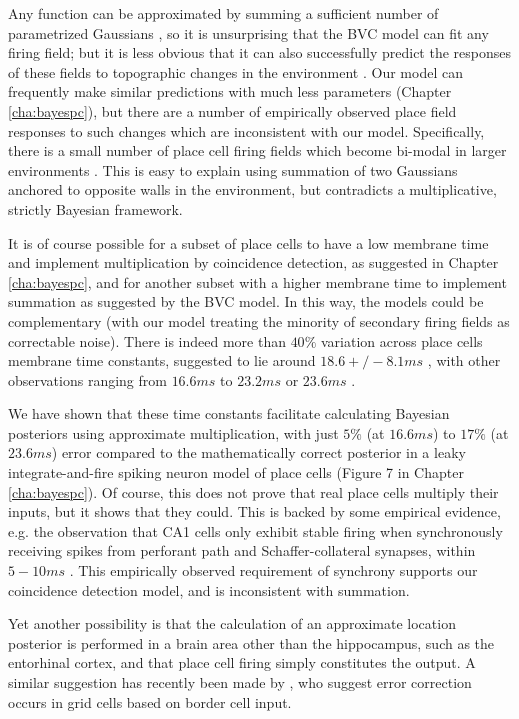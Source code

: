 Any function can be approximated by summing a sufficient number of parametrized Gaussians \citep{parzen1962estimation}, so it is unsurprising that the BVC model can fit any firing field; but it is less obvious that it can also successfully predict the responses of these fields to topographic changes in the environment \citep{barry2006boundary}. Our model can frequently make similar predictions with much less parameters (Chapter \ref{cha:bayespc}), but there are a number of empirically observed place field responses to such changes which are inconsistent with our model. Specifically, there is a small number of place cell firing fields which become bi-modal in larger environments \citep{okeefe1996geometric}. This is easy to explain using summation of two Gaussians anchored to opposite walls in the environment, but contradicts a multiplicative, strictly Bayesian framework.

It is of course possible for a subset of place cells to have a low membrane time and implement multiplication by coincidence detection, as suggested in Chapter \ref{cha:bayespc}, and for another subset with a higher membrane time to implement summation as suggested by the BVC model. In this way, the models could be complementary (with our model treating the minority of secondary firing fields as correctable noise). There is indeed more than $40\%$ variation across place cells membrane time constants, suggested to lie around $18.6 +/- 8.1 ms$ \citep{szilagyi1996physiological}, with other observations ranging from $16.6 ms$ \citep{zemankovics2010differences} to $23.2ms$ or $23.6ms$ \citep{johnston1981passive}. 

We have shown that these time constants facilitate calculating Bayesian posteriors using approximate multiplication, with just $5 \%$ (at $16.6 ms$) to $17 \%$ (at $23.6 ms$) error compared to the mathematically correct posterior in a leaky integrate-and-fire spiking neuron model of place cells (Figure 7 in Chapter \ref{cha:bayespc}). Of course, this does not prove that real place cells multiply their inputs, but it shows that they could. This is backed by some empirical evidence, e.g. the observation that CA1 cells only exhibit stable firing when synchronously receiving spikes from perforant path and Schaffer-collateral synapses, within $5-10ms$ \citep{jarsky2005conditional}. This empirically observed requirement of synchrony supports our coincidence detection model, and is inconsistent with summation. 

Yet another possibility is that the calculation of an approximate location posterior is performed in a brain area other than the hippocampus, such as the entorhinal cortex, and that place cell firing simply constitutes the output. A similar suggestion has recently been made by \cite{hardcastle2015environmental}, who suggest error correction occurs in grid cells based on border cell input.

